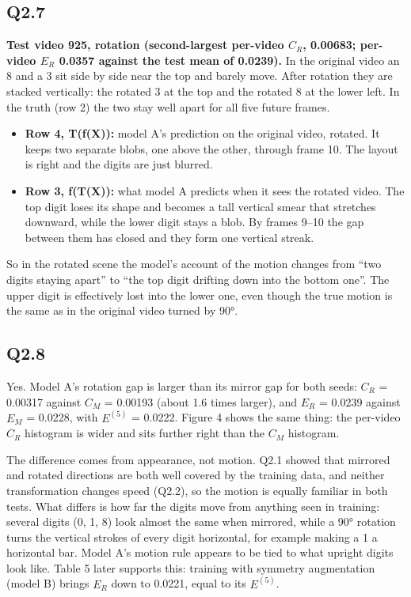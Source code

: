 \documentclass[11pt]{article}
\begin{document}
\subsection*{Q2.7}
\textbf{Test video 925, rotation (second-largest per-video \(C_R\), 0.00683; per-video \(E_R\) 0.0357 against the test mean of 0.0239).} In the original video an 8 and a 3 sit side by side near the top and barely move. After rotation they are stacked vertically: the rotated 3 at the top and the rotated 8 at the lower left. In the truth (row 2) the two stay well apart for all five future frames.

\begin{itemize}
\item
  \textbf{Row 4, T(f(X)):} model A's prediction on the original video, rotated. It keeps two separate blobs, one above the other, through frame 10. The layout is right and the digits are just blurred.
\item
  \textbf{Row 3, f(T(X)):} what model A predicts when it sees the rotated video. The top digit loses its shape and becomes a tall vertical smear that stretches downward, while the lower digit stays a blob. By frames 9--10 the gap between them has closed and they form one vertical streak.
\end{itemize}

So in the rotated scene the model's account of the motion changes from ``two digits staying apart'' to ``the top digit drifting down into the bottom one''. The upper digit is effectively lost into the lower one, even though the true motion is the same as in the original video turned by 90°.


\subsection*{Q2.8}
Yes. Model A's rotation gap is larger than its mirror gap for both seeds: \(C_R\) = 0.00317 against \(C_M\) = 0.00193 (about 1.6 times larger), and \(E_R\) = 0.0239 against \(E_M\) = 0.0228, with \(E^{(5)}\) = 0.0222. Figure 4 shows the same thing: the per-video \(C_R\) histogram is wider and sits further right than the \(C_M\) histogram.

The difference comes from appearance, not motion. Q2.1 showed that mirrored and rotated directions are both well covered by the training data, and neither transformation changes speed (Q2.2), so the motion is equally familiar in both tests. What differs is how far the digits move from anything seen in training: several digits (0, 1, 8) look almost the same when mirrored, while a 90° rotation turns the vertical strokes of every digit horizontal, for example making a 1 a horizontal bar. Model A's motion rule appears to be tied to what upright digits look like. Table 5 later supports this: training with symmetry augmentation (model B) brings \(E_R\) down to 0.0221, equal to its \(E^{(5)}\).
\end{document}
